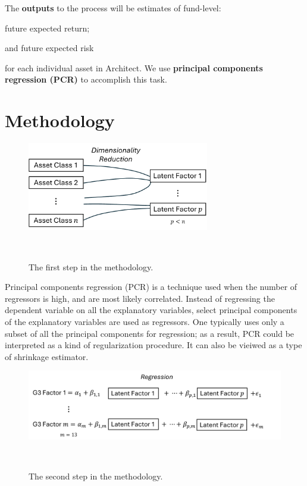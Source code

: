 \documentclass{ledger}
\begin{document}
The \textbf{outputs} to the process will be estimates of fund-level:
\begin{inparaenum}[$\bullet$]
	\item  future expected return;
	\item  and future expected risk
\end{inparaenum}
for each individual asset in Architect. We use \textbf{principal components regression (PCR)} to accomplish this task. 

\section{Methodology}
\begin{figure}[!ht]
\centering
	\includegraphics[width=225pt]{Step1.pdf}
	\caption{The first step in the methodology.} ~\\
\end{figure}

Principal components regression (PCR) is a technique used when the number of regressors is high, and are most likely correlated. Instead of regressing the dependent variable on all the explanatory variables, select principal components of the explanatory variables are used as regressors. One typically uses only a subset of all the principal components for regression; as a result, PCR could be interpreted as a kind of regularization procedure. It can also be vieiwed as a type of shrinkage estimator. \\

\begin{figure}[!ht]
\centering
	\includegraphics[width=375pt]{Step2.pdf}
	\caption{The second step in the methodology.} ~\\
\end{figure}
\end{document}
